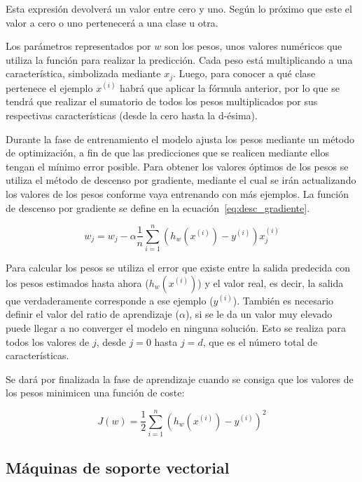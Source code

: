 \documentclass[a4paper, 12pt]{book}
\begin{document}
Esta expresión devolverá un valor entre cero y uno. Según lo próximo que este el valor a cero o uno pertenecerá a una clase u otra. 

Los parámetros representados por $w$ son los pesos, unos valores numéricos que utiliza la función para realizar la predicción. Cada peso está multiplicando a una característica, simbolizada mediante $x_j$. Luego, para conocer a qué clase pertenece el ejemplo $x^{(i)}$ habrá que aplicar la fórmula anterior, por lo que se tendrá que realizar el sumatorio de todos los pesos multiplicados por sus respectivas características (desde la cero hasta la d-ésima). 

Durante la fase de entrenamiento el modelo ajusta los pesos mediante un método de optimización, a fin de que las predicciones que se realicen mediante ellos tengan el mínimo error posible. Para obtener los valores óptimos de los pesos se utiliza el método de descenso por gradiente, mediante el cual se irán actualizando los valores de los pesos conforme vaya entrenando con más ejemplos. La función de descenso por gradiente se define en la ecuación~\ref{eq:desc_gradiente}.

\begin{equation}
    w_j = w_j - \alpha \frac{1}{n} \sum_{i= 1}^{n} (h_w(x^{(i)}) - y^{(i)}) x_j^{(i)}
    \label{eq:desc_gradiente}
\end{equation}

Para calcular los pesos se utiliza el error que existe entre la salida predecida con los pesos estimados hasta ahora ($h_w(x^{(i)})$) y el valor real, es decir, la salida que verdaderamente corresponde a ese ejemplo ($y^{(i)}$). También es necesario definir el valor del ratio de aprendizaje ($\alpha$), si se le da un valor muy elevado puede llegar a no converger el modelo en ninguna solución. Esto se realiza para todos los valores de $j$, desde $j= 0$ hasta $j= d$, que es el número total de características.

Se dará por finalizada la fase de aprendizaje cuando se consiga que los valores de los pesos minimicen una función de coste:

\begin{equation}
    J(w) = \frac{1}{2} \sum_{i= 1}^{n} {(h_w(x^{(i)}) - y^{(i)})}^2 
\end{equation}


\subsection{Máquinas de soporte vectorial}
\label{subsec:maquitas_soporte_vectorial}
\end{document}
